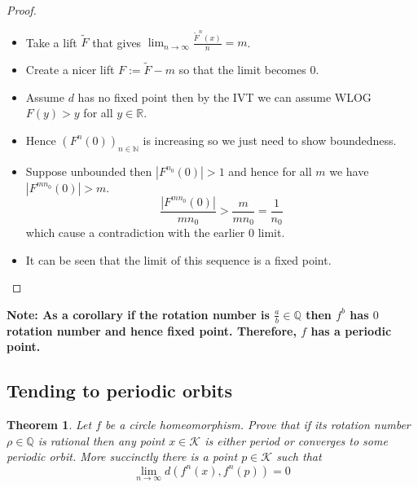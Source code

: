 \documentclass[11pt]{article}
\newcommand{\defeq}{:=}
\newcommand{\abs}[1]{|#1|}
\newcommand{\R}{\mathbb{R}}
\newcommand{\N}{\mathbb{N}}
\newcommand{\Q}{\mathbb{Q}}
\newenvironment{note}
	{\begin{mdframed}[backgroundcolor=white, linecolor=red, roundcorner=5pt, linewidth=1pt]\bfseries{Note:}\normalfont
	\setlength{\parindent}{0pt}}
	{\end{mdframed}}
\newtheorem{theorem}{Theorem}[section]
\begin{document}
\begin{proof}
\begin{itemize}
	\item Take a lift $\widetilde{F}$ that gives $\lim_{n\to\infty}\frac{\widetilde{F}^n(x)}{n}=m$.
	\item Create a nicer lift $F\defeq\widetilde{F}-m$ so that the limit becomes $0$.
	\item Assume $d$ has no fixed point then by the IVT we can assume WLOG $F(y) > y$ for all $y\in\R$.
	\item Hence $\left(F^n(0)\right)_{n\in\N}$ is increasing so we just need to show boundedness.
	\item Suppose unbounded then $\abs{F^{n_0}(0)}>1$ and hence for all $m$ we have $\abs{F^{mn_0}(0)} > m$.
		\[
			\frac{\abs{F^{mn_0}(0)}}{mn_0} > \frac{m}{mn_0} = \frac{1}{n_0}
		\]
		which cause a contradiction with the earlier $0$ limit.
	\item It can be seen that the limit of this sequence is a fixed point.
\end{itemize}
\end{proof}

\begin{note}
	As a corollary if the rotation number is $\frac{a}{b}\in\Q$ then $f^b$ has $0$ rotation number and hence fixed point.
	Therefore, $f$ has a periodic point.
\end{note}

\subsection{Tending to periodic orbits}
\begin{theorem}
Let $f$ be a circle homeomorphism.
Prove that if its rotation number $\rho\in\Q$ is rational then any point $x\in\mathcal{K}$ is either period or converges to some periodic orbit.
More succinctly there is a point $p\in\mathcal{K}$ such that
\[
	\lim_{n\to\infty}d(f^n(x), f^n(p))=0
\]
\end{theorem}
\end{document}
